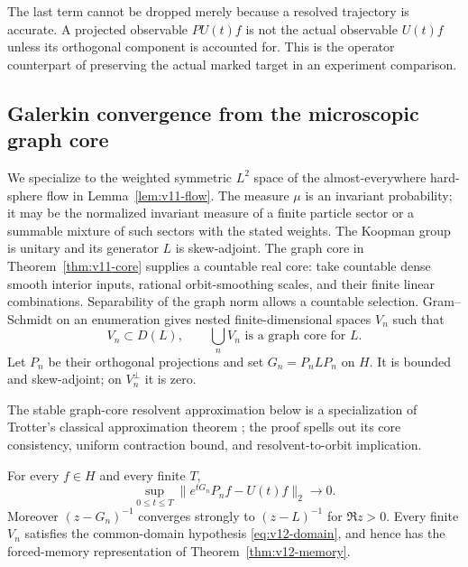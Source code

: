 The last term cannot be dropped merely because a resolved trajectory is
accurate. A projected observable $PU(t)f$ is not the actual observable
$U(t)f$ unless its orthogonal component is accounted for. This is the
operator counterpart of preserving the actual marked target in an
experiment comparison.

\subsection{Galerkin convergence from the microscopic graph core}
We specialize to the weighted symmetric $L^2$ space of the almost-everywhere
hard-sphere flow in Lemma~\ref{lem:v11-flow}. The measure $\mu$ is an
invariant probability; it may be the normalized invariant measure of a
finite particle sector or a summable mixture of such sectors with the
stated weights. The Koopman group is unitary and its generator $L$ is
skew-adjoint. The graph core in Theorem~\ref{thm:v11-core} supplies a
countable real core: take countable dense smooth interior inputs,
rational orbit-smoothing scales, and their finite linear combinations.
Separability of the graph norm allows a countable selection. Gram--Schmidt
on an enumeration gives nested finite-dimensional spaces $V_n$ such that
\[
 V_n\subset D(L),\qquad \bigcup_n V_n\text{ is a graph core for }L.
\]
Let $P_n$ be their orthogonal projections and set $G_n=P_nLP_n$ on $H$.
It is bounded and skew-adjoint; on $V_n^\perp$ it is zero.

The stable graph-core resolvent approximation below is a specialization
of Trotter's classical approximation theorem
\cite[Theorem~5.2]{Trotter1958}; the proof spells out its core consistency,
uniform contraction bound, and resolvent-to-orbit implication.

\begin{theorem}
\label{thm:v12-galerkin}
For every $f\in H$ and every finite $T$,
\begin{equation}
 \sup_{0\le t\le T}\|e^{tG_n}P_nf-U(t)f\|_2\longrightarrow0.
 \label{eq:v12-galerkin}
\end{equation}
Moreover $(z-G_n)^{-1}$ converges strongly to $(z-L)^{-1}$ for
$\Re z>0$. Every finite $V_n$ satisfies the common-domain hypothesis
\eqref{eq:v12-domain}, and hence has the forced-memory representation
of Theorem~\ref{thm:v12-memory}.
\end{theorem}

